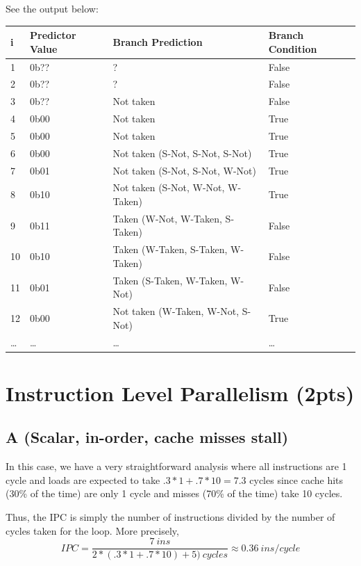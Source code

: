 \documentclass{article}
\begin{document}
See the output below:\\
\begin{tabular}{| l | l | l | l |}
\hline
  \bf{i} & \bf{Predictor Value} & \bf{Branch Prediction} & \bf{Branch Condition} \\\hline
  1 & 0b?? & ? & False \\\hline
  2 & 0b?? & ? & False \\\hline
  3 & 0b?? & Not taken & False \\\hline
  4 & 0b00 & Not taken & True \\\hline
  5 & 0b00 & Not taken & True \\\hline
  6 & 0b00 & Not taken (S-Not, S-Not, S-Not) & True \\\hline
  7 & 0b01 & Not taken (S-Not, S-Not, W-Not)  & True \\\hline
  8 & 0b10 & Not taken (S-Not, W-Not, W-Taken) & True \\\hline
  9 & 0b11 & Taken (W-Not, W-Taken, S-Taken)& False \\\hline
  10 & 0b10 & Taken (W-Taken, S-Taken, W-Taken) & False \\\hline
  11 & 0b01 & Taken (S-Taken, W-Taken, W-Not) & False \\\hline
  12 & 0b00 & Not taken (W-Taken, W-Not, S-Not) & True \\\hline
  \dots & \dots & \dots & \dots \\\hline
\end{tabular}
  
\newpage
 
\section{Instruction Level Parallelism (2pts)}
\subsection{A (Scalar, in-order, cache misses stall)}
In this case, we have a very straightforward analysis where all instructions are 1 cycle and loads are expected to take $.3*1 + .7*10 = 7.3$ cycles since cache hits (30\% of the time) are only 1 cycle and misses (70\% of the time) take 10 cycles.

Thus, the IPC is simply the number of instructions divided by the number of cycles taken for the loop. 
More precisely,
\begin{equation*}
IPC = \frac{7~ins}{2*(.3*1+.7*10) +5)~cycles} \approx 0.36~ins/cycle
\end{equation*}
\end{document}

